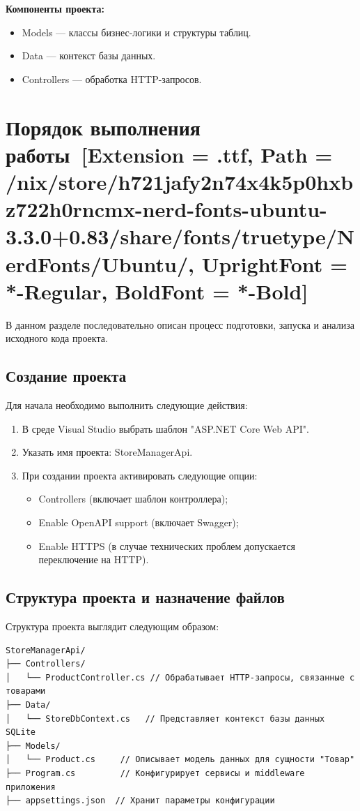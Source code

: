 \documentclass[12pt]{article}
\newcommand{\icon}[1]{\fontspec{UbuntuNerdFont}[Extension = .ttf,
  Path = /nix/store/h721jafy2n74x4k5p0hxbz722h0rncmx-nerd-fonts-ubuntu-3.3.0+0.83/share/fonts/truetype/NerdFonts/Ubuntu/,
  UprightFont = *-Regular,
BoldFont = *-Bold] #1}
\newcommand{\iicon}[1]{{\icon{#1}}}
\renewcommand{\texttt}[1]{{\small\ttfamily #1}}
\numberwithin{listing}{section}
\numberwithin{figure}{section}
\begin{document}
\noindent \textbf{Компоненты проекта:}
\begin{itemize}
	\item \texttt{Models} — классы бизнес-логики и структуры таблиц.
	\item \texttt{Data} — контекст базы данных.
	\item \texttt{Controllers} — обработка HTTP-запросов.
\end{itemize}

\pagebreak

\section{Порядок выполнения работы~\texorpdfstring{\iicon{󰈍}}{}}
В данном разделе последовательно описан процесс подготовки, запуска и анализа исходного кода проекта.

\subsection{Создание проекта}
Для начала необходимо выполнить следующие действия:
\begin{enumerate}
	\item В среде Visual Studio выбрать шаблон "ASP.NET Core Web API".
	\item Указать имя проекта: \texttt{StoreManagerApi}.
	\item При создании проекта активировать следующие опции:
	      \begin{itemize}
		      \item Controllers (включает шаблон контроллера);
		      \item Enable OpenAPI support (включает Swagger);
		      \item Enable HTTPS (в случае технических проблем допускается переключение на HTTP).
	      \end{itemize}
\end{enumerate}

\subsection{Структура проекта и назначение файлов}
Структура проекта выглядит следующим образом:
\begin{verbatim}
StoreManagerApi/
├── Controllers/
│   └── ProductController.cs // Обрабатывает HTTP-запросы, связанные с товарами
├── Data/
│   └── StoreDbContext.cs   // Представляет контекст базы данных SQLite
├── Models/
│   └── Product.cs     // Описывает модель данных для сущности "Товар"
├── Program.cs         // Конфигурирует сервисы и middleware приложения
├── appsettings.json  // Хранит параметры конфигурации
\end{verbatim}
\end{document}
